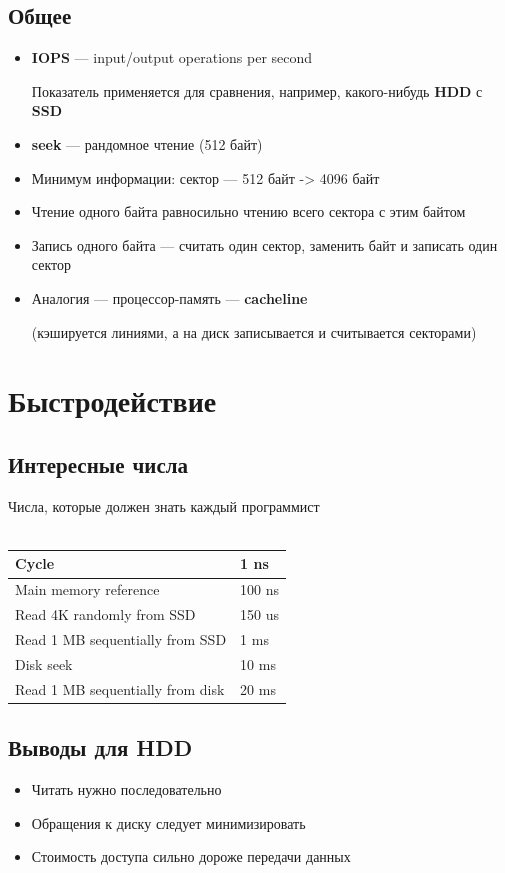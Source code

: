 \documentclass[../../lectures.tex]{subfiles}
\begin{document}
\subsection{Общее}
\begin{itemize}
    \item \textbf{IOPS} --- input/output operations per second
        
          Показатель применяется для сравнения, например, какого-нибудь \textbf{HDD} с \textbf{SSD}
    \item \textbf{seek} --- рандомное чтение (512 байт)
    \item Минимум информации: сектор --- 512 байт -> 4096 байт
    \item Чтение одного байта равносильно чтению всего сектора с этим байтом
    \item Запись одного байта --- считать один сектор, заменить байт и записать один сектор
    \item Аналогия --- процессор-память --- \textbf{cacheline} 
        
         (кэшируется линиями, а на диск записывается и считывается секторами)
\end{itemize}

\section{Быстродействие}
\subsection{Интересные числа}
\begin{center}
Числа, которые должен знать каждый программист
\\~\\
\begin{tabular}{| l | l |}
    \hline
    Cycle                            & 1   ns \\ \hline
    Main memory reference            & 100 ns \\ \hline
    Read 4K randomly from SSD        & 150 us \\ \hline
    Read 1 MB sequentially from SSD  & 1   ms \\ \hline
    Disk seek                        & 10  ms \\ \hline
    Read 1 MB sequentially from disk & 20  ms \\ \hline
\end{tabular}
\end{center}
\subsection{Выводы для HDD}
\begin{itemize}
    \item Читать нужно последовательно
    \item Обращения к диску следует минимизировать
    \item Стоимость доступа сильно дороже передачи данных
\end{itemize}
\end{document}
